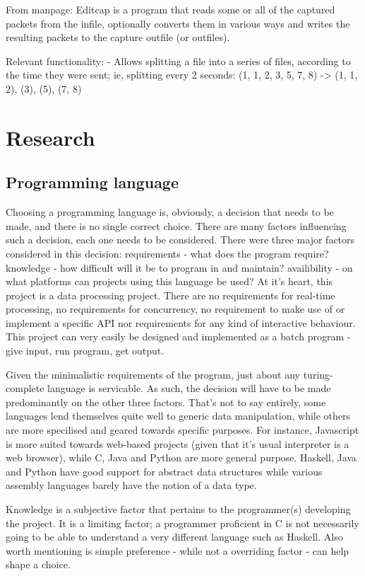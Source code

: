 \documentclass[10pt,a4paper]{report}
\begin{document}
From manpage\cite{editcap-man}:
\indent Editcap is a program that reads some or all of the captured packets from the infile, optionally converts them in various ways and writes the resulting packets to the capture outfile (or outfiles).

Relevant functionality:
 - Allows splitting a file into a series of files,
   according to the time they were sent; ie, splitting every 2 seconds:
   (1, 1, 2, 3, 5, 7, 8) -> (1, 1, 2), (3), (5), (7, 8)

\chapter{Research}
\section{Programming language}
Choosing a programming language is, obviously, a decision that needs to be made, and there is no single correct choice. There are many factors influencing such a decision, each one needs to be considered. There were three major factors considered in this decision: requirements - what does the program require? knowledge - how difficult will it be to program in and maintain? availibility - on what platforms can projects using this language be used?
At it's heart, this project is a data processing project. There are no requirements for real-time processing, no requirements for concurrency, no requirement to make use of or implement a specific API nor requirements for any kind of interactive behaviour. This project can very easily be designed and implemented as a batch program - give input, run program, get output.

Given the minimalistic requirements of the program, just about any turing-complete language is servicable. As such, the decision will have to be made predominantly on the other three factors. That's not to say entirely, some languages lend themselves quite well to generic data manipulation, while others are more specilised and geared towards specific purposes. For instance, Javascript is more suited towards web-based projects (given that it's usual interpreter is a web browser), while C, Java and Python are more general purpose. Haskell, Java and Python have good support for abstract data structures while various assembly languages barely have the notion of a data type.

Knowledge is a subjective factor that pertains to the programmer(s) developing the project. It is a limiting factor; a programmer proficient in C is not necessarily going to be able to understand a very different language such as Haskell. Also worth mentioning is simple preference - while not a overriding factor - can help shape a choice.
\end{document}
